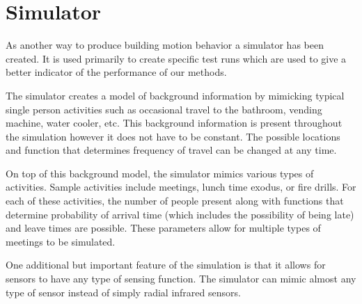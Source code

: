 \section{Simulator}
As another way to produce building motion behavior a simulator has been created.  It is used primarily to create specific test runs which are used to give a better indicator of the performance of our methods.

The simulator creates a model of background information by mimicking typical single person activities such as occasional travel to the bathroom, vending machine, water cooler, etc.  This background information is present throughout the simulation however it does not have to be constant.  The possible locations and function that determines frequency of travel can be changed at any time.  

On top of this background model, the simulator mimics various types of activities.  Sample activities include meetings, lunch time exodus, or fire drills.  For each of these activities, the number of people present along with functions that determine probability of arrival time (which includes the possibility of being late) and leave times are possible.  These parameters allow for multiple types of meetings to be simulated.  

One additional but important feature of the simulation is that it allows for sensors to have any type of sensing function.  The simulator can mimic almost any type of sensor instead of simply radial infrared sensors.